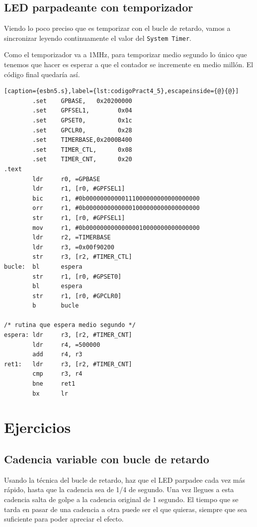 \subsection{LED parpadeante con temporizador}

Viendo lo poco preciso que es temporizar con el bucle de retardo, vamos a sincronizar leyendo
continuamente el valor del {\tt System Timer}.

Como el temporizador va a 1MHz, para temporizar medio segundo lo
único que tenemos que hacer es esperar a que el contador se incremente en medio millón. El código
final quedaría así.

\begin{lstlisting}[caption={esbn5.s},label={lst:codigoPract4_5},escapeinside={@}{@}]
        .set    GPBASE,   0x20200000
        .set    GPFSEL1,        0x04
        .set    GPSET0,         0x1c
        .set    GPCLR0,         0x28
        .set    TIMERBASE,0x2000B400
        .set    TIMER_CTL,      0x08
        .set    TIMER_CNT,      0x20
.text
        ldr     r0, =GPBASE
        ldr     r1, [r0, #GPFSEL1]
        bic     r1, #0b00000000000111000000000000000000
        orr     r1, #0b00000000000001000000000000000000
        str     r1, [r0, #GPFSEL1]
        mov     r1, #0b00000000000000010000000000000000
        ldr     r2, =TIMERBASE
        ldr     r3, =0x00f90200
        str     r3, [r2, #TIMER_CTL]
bucle:  bl      espera
        str     r1, [r0, #GPSET0]
        bl      espera
        str     r1, [r0, #GPCLR0]
        b       bucle

/* rutina que espera medio segundo */
espera: ldr     r3, [r2, #TIMER_CNT]
        ldr     r4, =500000
        add     r4, r3
ret1:   ldr     r3, [r2, #TIMER_CNT]
        cmp     r3, r4
        bne     ret1
        bx      lr
\end{lstlisting}

\section{Ejercicios}

\subsection{Cadencia variable con bucle de retardo}

Usando la técnica del bucle de retardo, haz que el LED parpadee
cada vez más rápido, hasta que la cadencia sea de 1/4 de segundo.
Una vez llegues a esta cadencia salta de golpe a la cadencia
original de 1 segundo. El tiempo que se tarda en pasar de una
cadencia a otra puede ser el que quieras, siempre que sea
suficiente para poder apreciar el efecto.

